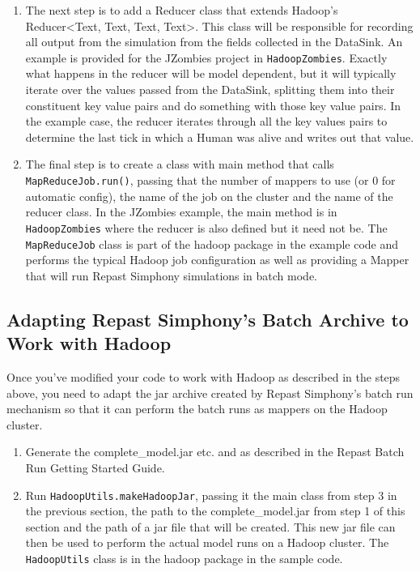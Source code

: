 \documentclass[11pt]{amsart}
\begin{document}
\begin{enumerate}
\begin{minipage}[h]{\textwidth}
\begin{lstlisting}
\end{lstlisting}
\vspace{.2in}
\end{minipage}

\item
The next step is to add a Reducer class that extends Hadoop's Reducer<Text, Text, Text, Text>. This class will be responsible for recording all output from the simulation from the fields collected in the DataSink. An example is provided for the JZombies project in \texttt{HadoopZombies}. Exactly what happens in the reducer will be model dependent, but it will typically iterate over the values passed from the DataSink, splitting them into their constituent key value pairs and do something with those key value pairs. In the example case, the reducer iterates through all the key values pairs to determine the last tick in which a Human was alive and writes out that value.

\item
The final step is to create a class with main method that calls \texttt{MapReduceJob.run()}, passing that the number of mappers to use (or 0 for automatic config), the name of the job on the cluster and the name of the reducer class. In the JZombies example, the main method is in \texttt{HadoopZombies} where the reducer is also defined but it need not be. The \texttt{MapReduceJob} class is part of the hadoop package in the example code and performs the typical Hadoop job configuration as well as providing a Mapper that will run Repast Simphony simulations in batch mode.
\end{enumerate}


\subsection{Adapting Repast Simphony's Batch Archive to Work with Hadoop}
Once you've modified your code to work with Hadoop as described in the steps above, you need to adapt the jar archive created by Repast Simphony's batch run mechanism so that it can perform the batch runs as mappers on the Hadoop cluster.

\begin{enumerate}
\item
Generate the complete\_model.jar etc. and as described in the Repast Batch Run Getting Started Guide.
\item
Run \texttt{HadoopUtils.makeHadoopJar}, passing it the main class from step 3 in the previous section, the path to the complete\_model.jar from step 1 of this section and the path of a jar file that will be created. This new jar file can then be used to perform the actual model runs on a Hadoop cluster. The \texttt{HadoopUtils} class is in the hadoop package in the sample code.
\end{enumerate}
\end{document}

